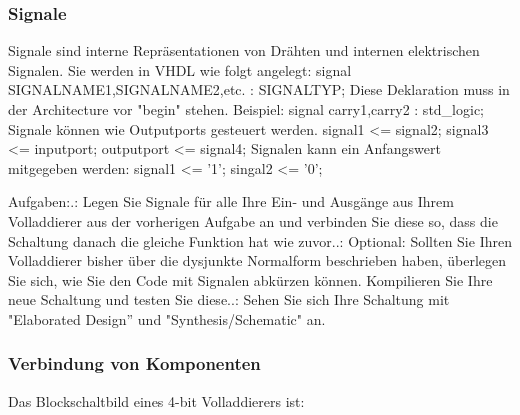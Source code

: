 \documentclass{article}
\begin{document}
\subsubsection{Signale}
Signale sind interne Repr\"asentationen von Dr\"ahten und internen elektrischen Signalen. Sie werden in VHDL wie folgt angelegt:\newline
signal SIGNALNAME1,SIGNALNAME2,etc. : SIGNALTYP;\newline
Diese Deklaration muss in der Architecture vor "begin" stehen.\newline
Beispiel:\newline
signal carry1,carry2 : std\_logic;\newline
Signale k\"onnen wie Outputports gesteuert werden.\newline
signal1 <= signal2;\newline
signal3 <= inputport;\newline
outputport <= signal4;\newline
Signalen kann ein Anfangswert mitgegeben werden:\newline
signal1 <= '1';\newline
singal2 <= '0';\newline

Aufgaben:.: Legen Sie Signale f\"ur alle Ihre Ein- und Ausg\"ange aus Ihrem Volladdierer aus der vorherigen Aufgabe an und verbinden Sie diese so, dass die Schaltung danach die gleiche Funktion hat wie zuvor..: Optional: Sollten Sie Ihren Volladdierer bisher \"uber die dysjunkte Normalform beschrieben haben, \"uberlegen Sie sich, wie Sie den Code mit Signalen abk\"urzen k\"onnen. Kompilieren Sie Ihre neue Schaltung und testen Sie diese..: Sehen Sie sich Ihre Schaltung mit "Elaborated Design'' und "Synthesis/Schematic" an.

\subsubsection{Verbindung von Komponenten}
Das Blockschaltbild eines 4-bit Volladdierers ist:\newline
\end{document}
